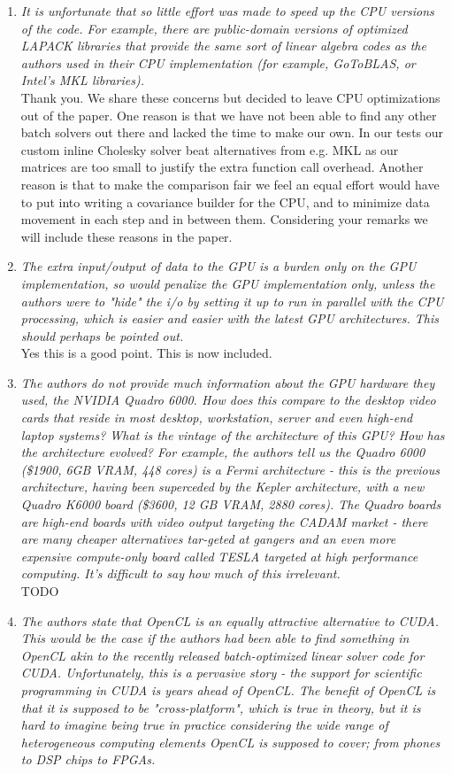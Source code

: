 \documentclass[11pt]{article} %
\newcommand\1{\vec 1}
\newcommand\q[1]{\textit{#1}}
\newcommand\qi[1]{\item\q{#1}}
\newcommand\ans[1]{#1}
\newcommand\ai[1]{\\[.5\baselineskip]\ans{#1}}
\begin{document}
\begin{enumerate}
\qi{It is unfortunate that so little effort was made to speed up the CPU versions of the code. For example, there are public-domain versions of optimized LAPACK libraries that provide the same sort of linear algebra codes as the authors used in their CPU implementation (for example, GoToBLAS, or Intel's MKL libraries).}
\ai{Thank you. We share these concerns but decided to leave CPU optimizations out of the paper. One reason is that we have not been able to find any other batch solvers out there and lacked the time to make our own. In our tests our custom inline Cholesky solver beat alternatives from e.g. MKL as our matrices are too small to justify the extra function call overhead. Another reason is that to make the comparison fair we feel an equal effort would have to put into writing a covariance builder for the CPU, and to minimize data movement in each step and in between them. Considering your remarks we will include these reasons in the paper.}
%
\qi{The extra input/output of data to the GPU is a burden only on the GPU implementation, so would penalize the GPU implementation only, unless the authors were to "hide" the i/o by setting it up to run in parallel with the CPU processing, which is easier and easier with the latest GPU architectures. This should perhaps be pointed out.}
\ai{Yes this is a good point. This is now included.}
%
\qi{The authors do not provide much information about the GPU hardware they used, the NVIDIA Quadro 6000. How does this compare to the desktop video cards that reside in most desktop, workstation, server and even high-end laptop systems? What is the vintage of the architecture of this GPU? How has the architecture evolved? For example, the authors tell us the Quadro 6000 (\$1900, 6GB VRAM, 448 cores) is a Fermi architecture - this is the previous architecture, having been superceded by the Kepler architecture, with a new Quadro K6000 board (\$3600, 12 GB VRAM, 2880 cores). The Quadro boards are high-end boards with video output targeting the CADAM market - there are many cheaper alternatives tar-geted at gangers and an even more expensive compute-only board called TESLA targeted at high performance computing. It's difficult to say how much of this irrelevant. }
\ai{TODO}
%
\qi{The authors state that OpenCL is an equally attractive alternative to CUDA. This would be the case if the authors had been able to find something in OpenCL akin to the recently released batch-optimized linear solver code for CUDA. Unfortunately, this is a pervasive story - the support for scientific programming in CUDA is years ahead of OpenCL. The benefit of OpenCL is that it is supposed to be "cross-platform", which is true in theory, but it is hard to imagine being true in practice considering the wide range of heterogeneous computing elements OpenCL is supposed to cover; from phones to DSP chips to FPGAs. }

\end{enumerate}
\end{document}

